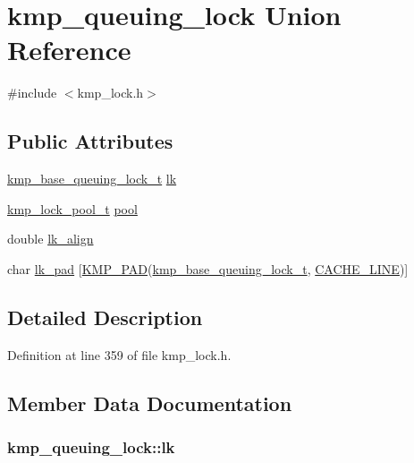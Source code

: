 \hypertarget{unionkmp__queuing__lock}{\section{kmp\-\_\-queuing\-\_\-lock Union Reference}
\label{unionkmp__queuing__lock}
}


{\ttfamily \#include $<$kmp\-\_\-lock.\-h$>$}

\subsection*{Public Attributes}
\begin{DoxyCompactItemize}
\item 
\hyperlink{kmp__lock_8h_ab8f5f3d036fb40f76bc95272e265e0f0}{kmp\-\_\-base\-\_\-queuing\-\_\-lock\-\_\-t} \hyperlink{unionkmp__queuing__lock_a3c11a864f3b00af968449bd561d0da1b}{lk}
\item 
\hyperlink{kmp__lock_8h_a467f5477f4f5397ebd24a94c85922744}{kmp\-\_\-lock\-\_\-pool\-\_\-t} \hyperlink{unionkmp__queuing__lock_af7aec478c8146a10357708c638cd63e5}{pool}
\item 
double \hyperlink{unionkmp__queuing__lock_aafd587a09109cb5222af369fb68a0c01}{lk\-\_\-align}
\item 
char \hyperlink{unionkmp__queuing__lock_a3f277c8bd18feb404b759189e867c64c}{lk\-\_\-pad} \mbox{[}\hyperlink{kmp__lock_8h_a7e782410115489f45ab1686c39a2bb89}{K\-M\-P\-\_\-\-P\-A\-D}(\hyperlink{kmp__lock_8h_ab8f5f3d036fb40f76bc95272e265e0f0}{kmp\-\_\-base\-\_\-queuing\-\_\-lock\-\_\-t}, \hyperlink{kmp__os_8h_a86194c659a2d795e5f5949d293ae4661}{C\-A\-C\-H\-E\-\_\-\-L\-I\-N\-E})\mbox{]}
\end{DoxyCompactItemize}


\subsection{Detailed Description}


Definition at line 359 of file kmp\-\_\-lock.\-h.



\subsection{Member Data Documentation}
\hypertarget{unionkmp__queuing__lock_a3c11a864f3b00af968449bd561d0da1b}{
\subsubsection[{lk}]{ kmp\-\_\-queuing\-\_\-lock\-::lk}}\label{unionkmp__queuing__lock_a3c11a864f3b00af968449bd561d0da1b}


